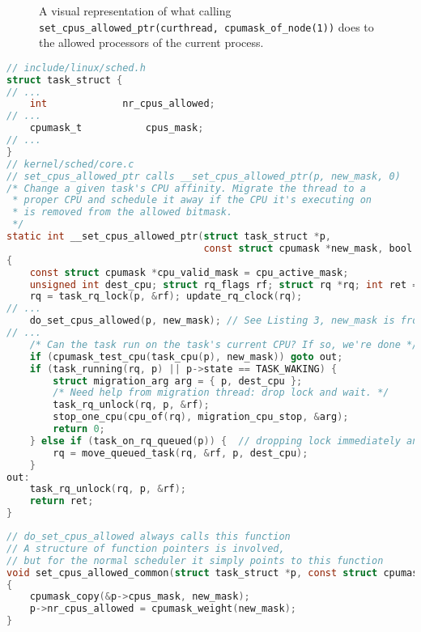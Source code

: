 \begin{figure}[H]
    \centering
    \resizebox{0.5\linewidth}{!}{}
    \captionsetup{width=0.6\linewidth}
    \caption{A visual representation of what calling \texttt{set\_cpus\_allowed\_ptr(curthread, cpumask\_of\_node(1))}
    does to the allowed processors of the current process.}
    \label{fig:setcpusallowed1}
\end{figure}

\singlespacing
\begin{lstlisting}[caption={The relevant chapters of Linux's scheduler code that handles a change in the cpumask indicating where a process is allowed to execute},label={lst:linux_set_cpus_allowed},language=C]
// include/linux/sched.h
struct task_struct {
// ...
	int				nr_cpus_allowed;
// ...
	cpumask_t			cpus_mask;
// ...
}
// kernel/sched/core.c
// set_cpus_allowed_ptr calls __set_cpus_allowed_ptr(p, new_mask, 0)
/* Change a given task's CPU affinity. Migrate the thread to a
 * proper CPU and schedule it away if the CPU it's executing on
 * is removed from the allowed bitmask.
 */
static int __set_cpus_allowed_ptr(struct task_struct *p, 
                                  const struct cpumask *new_mask, bool check)
{
	const struct cpumask *cpu_valid_mask = cpu_active_mask;
	unsigned int dest_cpu; struct rq_flags rf; struct rq *rq; int ret = 0;
	rq = task_rq_lock(p, &rf); update_rq_clock(rq);
// ...
	do_set_cpus_allowed(p, new_mask); // See Listing 3, new_mask is from cpumask_of_node
// ...
	/* Can the task run on the task's current CPU? If so, we're done */
	if (cpumask_test_cpu(task_cpu(p), new_mask)) goto out;
	if (task_running(rq, p) || p->state == TASK_WAKING) {
		struct migration_arg arg = { p, dest_cpu }; 
		/* Need help from migration thread: drop lock and wait. */
		task_rq_unlock(rq, p, &rf);
        stop_one_cpu(cpu_of(rq), migration_cpu_stop, &arg);
		return 0;
	} else if (task_on_rq_queued(p)) {	// dropping lock immediately anyways
	    rq = move_queued_task(rq, &rf, p, dest_cpu);
	}
out:
	task_rq_unlock(rq, p, &rf);
	return ret;
}
\end{lstlisting}
\begin{lstlisting}[caption={The relevant chapters of Linux's scheduler code that set a process's cpumask},label={lst:linux_set_cpus_allowed_common},language=C]
// do_set_cpus_allowed always calls this function
// A structure of function pointers is involved, 
// but for the normal scheduler it simply points to this function 
void set_cpus_allowed_common(struct task_struct *p, const struct cpumask *new_mask)
{
	cpumask_copy(&p->cpus_mask, new_mask);
	p->nr_cpus_allowed = cpumask_weight(new_mask);
}
\end{lstlisting}
\doublespacing

